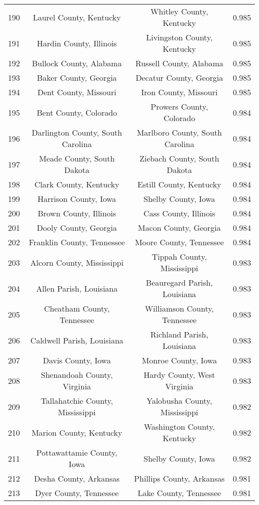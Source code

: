 \begin{longtable}{cccc}
  190 & Laurel County, Kentucky & Whitley County, Kentucky & 0.985 \\ 
  191 & Hardin County, Illinois & Livingston County, Kentucky & 0.985 \\ 
  192 & Bullock County, Alabama & Russell County, Alabama & 0.985 \\ 
  193 & Baker County, Georgia & Decatur County, Georgia & 0.985 \\ 
  194 & Dent County, Missouri & Iron County, Missouri & 0.985 \\ 
  195 & Bent County, Colorado & Prowers County, Colorado & 0.984 \\ 
  196 & Darlington County, South Carolina & Marlboro County, South Carolina & 0.984 \\ 
  197 & Meade County, South Dakota & Ziebach County, South Dakota & 0.984 \\ 
  198 & Clark County, Kentucky & Estill County, Kentucky & 0.984 \\ 
  199 & Harrison County, Iowa & Shelby County, Iowa & 0.984 \\ 
  200 & Brown County, Illinois & Cass County, Illinois & 0.984 \\ 
  201 & Dooly County, Georgia & Macon County, Georgia & 0.984 \\ 
  202 & Franklin County, Tennessee & Moore County, Tennessee & 0.984 \\ 
  203 & Alcorn County, Mississippi & Tippah County, Mississippi & 0.983 \\ 
  204 & Allen Parish, Louisiana & Beauregard Parish, Louisiana & 0.983 \\ 
  205 & Cheatham County, Tennessee & Williamson County, Tennessee & 0.983 \\ 
  206 & Caldwell Parish, Louisiana & Richland Parish, Louisiana & 0.983 \\ 
  207 & Davis County, Iowa & Monroe County, Iowa & 0.983 \\ 
  208 & Shenandoah County, Virginia & Hardy County, West Virginia & 0.983 \\ 
  209 & Tallahatchie County, Mississippi & Yalobusha County, Mississippi & 0.982 \\ 
  210 & Marion County, Kentucky & Washington County, Kentucky & 0.982 \\ 
  211 & Pottawattamie County, Iowa & Shelby County, Iowa & 0.982 \\ 
  212 & Desha County, Arkansas & Phillips County, Arkansas & 0.981 \\ 
  213 & Dyer County, Tennessee & Lake County, Tennessee & 0.981 \\ 

\end{longtable}
